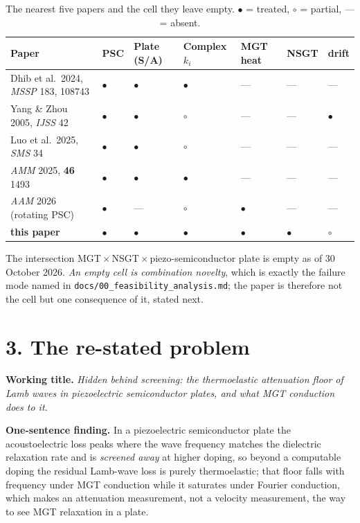 \documentclass[11pt]{article}
\begin{document}
\begin{table}[h]
\centering\small
\caption{The nearest five papers and the cell they leave empty.
$\bullet$ = treated, $\circ$ = partial, --- = absent.}
\begin{tabular}{p{4.1cm}p{1.5cm}p{1.1cm}p{1.1cm}p{1.1cm}p{1.1cm}p{1.1cm}}
\hline
Paper & PSC & Plate (S/A) & Complex $k_i$ & MGT heat & NSGT & drift \\
\hline
Dhib et al.\ 2024, \emph{MSSP} 183, 108743 & $\bullet$ & $\bullet$ & $\bullet$ & --- & --- & --- \\
Yang \& Zhou 2005, \emph{IJSS} 42 & $\bullet$ & $\bullet$ & $\circ$ & --- & --- & $\bullet$ \\
Luo et al.\ 2025, \emph{SMS} 34 & $\bullet$ & $\bullet$ & $\circ$ & --- & --- & --- \\
\emph{AMM} 2025, \textbf{46} 1493 & $\bullet$ & $\bullet$ & $\bullet$ & --- & --- & --- \\
\emph{AAM} 2026 (rotating PSC) & $\bullet$ & --- & $\circ$ & $\bullet$ & --- & --- \\
\hline
\textbf{this paper} & $\bullet$ & $\bullet$ & $\bullet$ & $\bullet$ & $\bullet$ & $\circ$ \\
\hline
\end{tabular}
\end{table}

The intersection MGT\,$\times$\,NSGT\,$\times$\,piezo-semiconductor plate is empty as of
30 October 2026. \emph{An empty cell is combination novelty}, which is exactly the failure mode
named in \texttt{docs/00\_feasibility\_analysis.md}; the paper is therefore not the cell but one
consequence of it, stated next.

\section*{3. The re-stated problem}
\textbf{Working title.} \emph{Hidden behind screening: the thermoelastic attenuation floor of Lamb
waves in piezoelectric semiconductor plates, and what MGT conduction does to it.}

\textbf{One-sentence finding.} In a piezoelectric semiconductor plate the acoustoelectric loss peaks
where the wave frequency matches the dielectric relaxation rate and is \emph{screened away} at
higher doping, so beyond a computable doping the residual Lamb-wave loss is purely thermoelastic;
that floor falls with frequency under MGT conduction while it saturates under Fourier conduction,
which makes an attenuation measurement, not a velocity measurement, the way to see MGT relaxation
in a plate.
\end{document}
